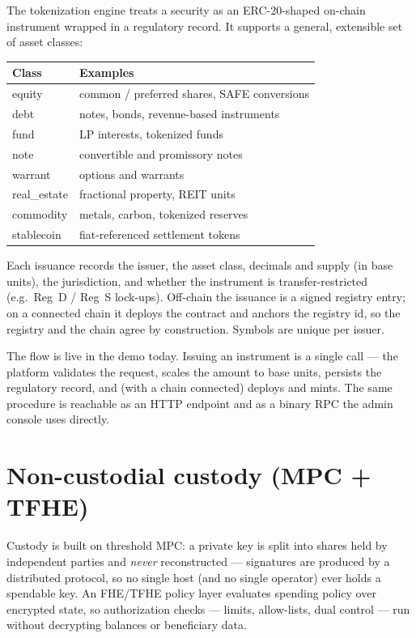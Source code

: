 \documentclass[11pt,a4paper]{article}
\begin{document}
The tokenization engine treats a security as an ERC-20-shaped on-chain
instrument wrapped in a regulatory record. It supports a general,
extensible set of asset classes:

\begin{center}
\begin{tabular}{ll}
\toprule
Class & Examples \\
\midrule
equity      & common / preferred shares, SAFE conversions \\
debt        & notes, bonds, revenue-based instruments \\
fund        & LP interests, tokenized funds \\
note        & convertible and promissory notes \\
warrant     & options and warrants \\
real\_estate & fractional property, REIT units \\
commodity   & metals, carbon, tokenized reserves \\
stablecoin  & fiat-referenced settlement tokens \\
\bottomrule
\end{tabular}
\end{center}

Each issuance records the issuer, the asset class, decimals and supply (in
base units), the jurisdiction, and whether the instrument is
transfer-restricted (e.g.\ Reg~D / Reg~S lock-ups). Off-chain the
issuance is a signed registry entry; on a connected chain it deploys the
contract and anchors the registry id, so the registry and the chain agree
by construction. Symbols are unique per issuer.

The flow is live in the demo today. Issuing an instrument is a single
call --- the platform validates the request, scales the amount to base
units, persists the regulatory record, and (with a chain connected)
deploys and mints. The same procedure is reachable as an HTTP endpoint and
as a binary RPC the admin console uses directly.

\section{Non-custodial custody (MPC + TFHE)}

Custody is built on threshold MPC: a private key is split into shares held
by independent parties and \emph{never} reconstructed --- signatures are
produced by a distributed protocol, so no single host (and no single
operator) ever holds a spendable key. An FHE/TFHE policy layer evaluates
spending policy over encrypted state, so authorization checks --- limits,
allow-lists, dual control --- run without decrypting balances or
beneficiary data.
\end{document}
